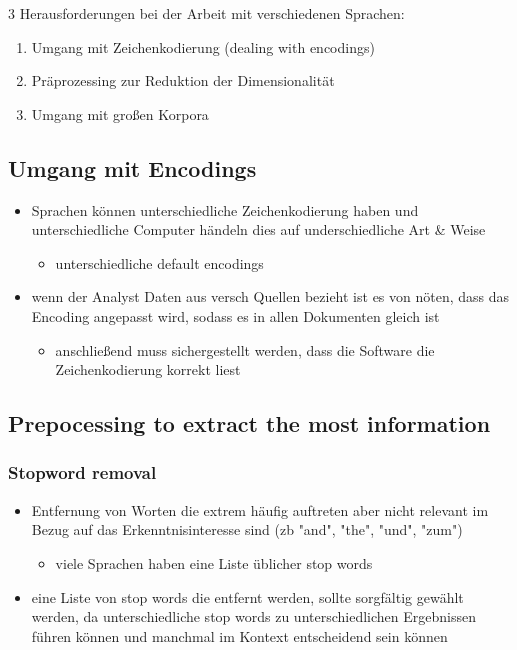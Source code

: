 \documentclass[11pt]{article}
\begin{document}
3 Herausforderungen bei der Arbeit mit verschiedenen Sprachen:
\begin{enumerate}
\item Umgang mit Zeichenkodierung (dealing with encodings)
\item Präprozessing zur Reduktion der Dimensionalität
\item Umgang mit großen Korpora
\end{enumerate}
\subsection{Umgang mit Encodings}
\label{sec:org4c43669}
\begin{itemize}
\item Sprachen können unterschiedliche Zeichenkodierung haben und unterschiedliche Computer händeln dies auf underschiedliche Art \& Weise
\begin{itemize}
\item unterschiedliche default encodings
\end{itemize}
\item wenn der Analyst Daten aus versch Quellen bezieht ist es von nöten, dass das Encoding angepasst wird, sodass es in allen Dokumenten gleich ist 
\begin{itemize}
\item anschließend muss sichergestellt werden, dass die Software die Zeichenkodierung korrekt liest
\end{itemize}
\end{itemize}

\subsection{Prepocessing to extract the most information}
\label{sec:org8a34929}
\subsubsection{Stopword removal}
\label{sec:orga6d8710}
\begin{itemize}
\item Entfernung von Worten die extrem häufig auftreten aber nicht relevant im Bezug auf das Erkenntnisinteresse sind (zb "and", "the", "und", "zum")
\begin{itemize}
\item viele Sprachen haben eine Liste üblicher stop words
\end{itemize}
\item eine Liste von stop words die entfernt werden, sollte sorgfältig gewählt werden, da unterschiedliche stop words zu unterschiedlichen Ergebnissen führen können und manchmal im Kontext entscheidend sein können
\end{itemize}
\end{document}
